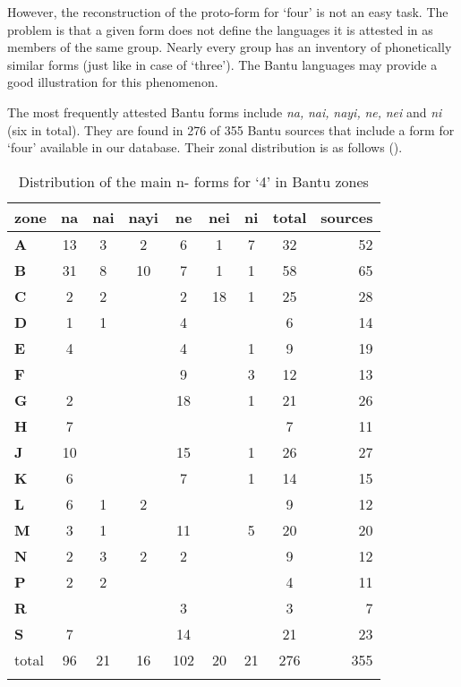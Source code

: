 However, the reconstruction of the proto-form for ‘four’ is not an easy task. The problem is that a given form does not define the languages it is attested in as members of the same group. Nearly every group has an inventory of phonetically similar forms (just like in case of ‘three’). The Bantu languages may provide a good illustration for this phenomenon. 

The most frequently attested Bantu forms include \textit{na,} \textit{nai,} \textit{nayi,} \textit{ne,} \textit{nei} and \textit{ni} (six in total). They are found in 276 of 355 Bantu sources that include a form for ‘four’ available in our database. Their zonal distribution is as follows ().

\begin{table}
\caption{\label{tab:4:14}Distribution of the main n- forms for `4' in Bantu zones}


\begin{tabularx}{\textwidth}{lSSSSSSSr}
\lsptoprule
zone & \textbf{na} & \textbf{nai} & \textbf{nayi} & \textbf{ne} & \textbf{nei} & \textbf{ni} & total&sources\\
\midrule
\textbf{A} & 13 & 3 & 2 & 6 & 1 & 7 & 32 & 52\\
\textbf{B} & 31 & 8 & 10 & 7 & 1 & 1 & 58 & 65\\
\textbf{C} & 2 & 2 & ~ & 2 & 18 & 1 & 25 & 28\\
\textbf{D} & 1 & 1 & ~ & 4 & ~ & ~ & 6 & 14\\
\textbf{E} & 4 & ~ & ~ & 4 & ~ & 1 & 9 & 19\\
\textbf{F} & ~ & ~ & ~ & 9 & ~ & 3 & 12 & 13\\
\textbf{G} & 2 & ~ & ~ & 18 & ~ & 1 & 21 & 26\\
\textbf{H} & 7 & ~ & ~ & ~ & ~ & ~ & 7 & 11\\
\textbf{J} & 10 & ~ & ~ & 15 & ~ & 1 & 26 & 27\\
\textbf{K} & 6 & ~ & ~ & 7 & ~ & 1 & 14 & 15\\
\textbf{L} & 6 & 1 & 2 & ~ & ~ & ~ & 9 & 12\\
\textbf{M} & 3 & 1 & ~ & 11 & ~ & 5 & 20 & 20\\
\textbf{N} & 2 & 3 & 2 & 2 & ~ & ~ & 9 & 12\\
\textbf{P} & 2 & 2 & ~ & ~ & ~ & ~ & 4 & 11\\
\textbf{R} & ~ & ~ & ~ & 3 & ~ & ~ & 3 & 7\\
\textbf{S} & 7 & ~ & ~ & 14 & ~ & ~ & 21 & 23\\
\midrule 
total & 96 & 21 & 16 & 102 & 20 & 21 & 276 & 355\\

\lspbottomrule
\end{tabularx}
\end{table}

